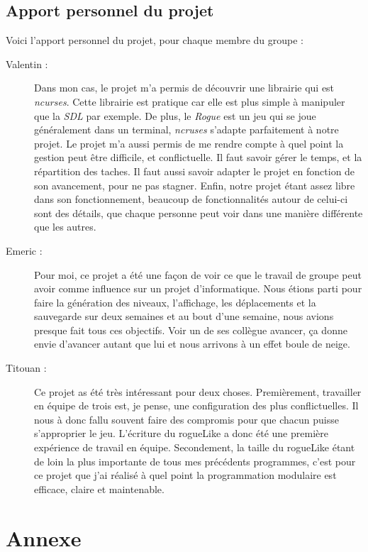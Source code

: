 \documentclass[11pt]{report}
\begin{document}
	\section{Apport personnel du projet}
	
	Voici l'apport personnel du projet, pour chaque membre du groupe :
	
	\begin{description}
	\item[Valentin :] Dans mon cas, le projet m'a permis de découvrir une librairie qui est \emph{ncurses}. Cette librairie est pratique car elle est plus simple à manipuler que la \emph{SDL} par exemple. De plus, le \emph{Rogue} est un jeu qui se joue généralement dans un terminal, \emph{ncruses} s'adapte parfaitement à notre projet. Le projet m'a aussi permis de me rendre compte à quel point la gestion peut être difficile, et conflictuelle. Il faut savoir gérer le temps, et la répartition des taches. Il faut aussi savoir adapter le projet en fonction de son avancement, pour ne pas stagner. Enfin, notre projet étant assez libre dans son fonctionnement, beaucoup de fonctionnalités autour de celui-ci sont des détails, que chaque personne peut voir dans une manière différente que les autres. 
	\item[Emeric :] Pour moi, ce projet a été une façon de voir ce que le travail de groupe peut avoir comme influence sur un projet d'informatique. Nous étions parti pour faire la génération des niveaux, l'affichage, les déplacements et la sauvegarde sur deux semaines et au bout d'une semaine, nous avions presque fait tous ces objectifs. Voir un de ses collègue avancer, ça donne envie d'avancer autant que lui et nous arrivons à un effet boule de neige.
	\item[Titouan :] Ce projet as été très intéressant pour deux choses. Premièrement, travailler en équipe de trois est, je pense, une configuration des plus conflictuelles. Il nous à donc fallu souvent faire des compromis pour que chacun puisse s'approprier le jeu. L'écriture du rogueLike a donc été une première expérience de travail en équipe. Secondement, la taille du rogueLike étant de loin la plus importante de tous mes précédents programmes, c'est pour ce projet que j'ai réalisé à quel point la programmation modulaire est efficace, claire et maintenable.
	\end{description}

\chapter*{Annexe}
\end{document}

